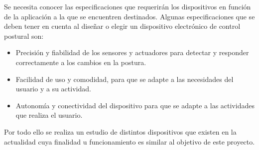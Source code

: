 Se necesita conocer las especificaciones que requerirán los dispositivos en función de la aplicación a la que se encuentren destinados. Algunas especificaciones que se deben tener en cuenta al diseñar o elegir un dispositivo electrónico de control postural son: 
\begin{itemize}
    \item Precisión y fiabilidad de los sensores y actuadores para detectar y responder correctamente a los cambios en la postura. 

    \item Facilidad de uso y comodidad, para que se adapte a las necesidades del usuario y a su actividad. 

    \item Autonomía y conectividad del dispositivo para que se adapte a las actividades que realiza el usuario. 
\end{itemize}

Por todo ello se realiza un estudio de distintos dispositivos que existen en la actualidad cuya finalidad u funcionamiento es similar al objetivo de este proyecto. 


